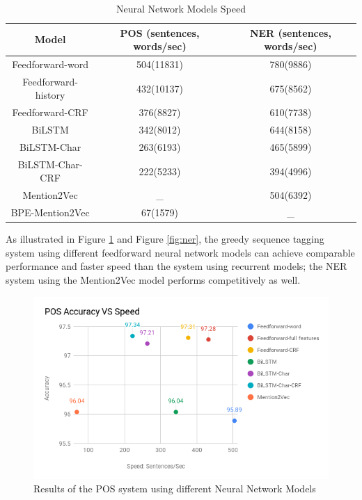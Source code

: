 \documentclass{sfuthesis}
\begin{document}
\begin{table}[]
\centering
\caption{Neural Network Models Speed}
\label{table:my-label2}
\begin{tabular}{|c|c|c|}
\hline
Model       & POS  (sentences, words/sec)  & NER  (sentences, words/sec)      \\ \hline
Feedforward-word    & 504(11831)     & 780(9886)    \\ \hline
Feedforward-history & 432(10137)     & 675(8562)     \\ \hline
Feedforward-CRF     & 376(8827)     & 610(7738)     \\ \hline
BiLSTM             & 342(8012)     & 644(8158)       \\ \hline
BiLSTM-Char        & 263(6193)  & 465(5899)             \\ \hline
BiLSTM-Char-CRF    & 222(5233)  & 394(4996)         \\ \hline
Mention2Vec         & _      & 504(6392)              \\ \hline
BPE-Mention2Vec     & 67(1579)  &  _               \\ \hline   
\end{tabular}
\end{table}

As illustrated in Figure \ref{fig:pos} and Figure \ref{fig:ner}, the greedy sequence tagging system using different feedforward neural network models can achieve comparable performance and faster speed than the system using recurrent models; the NER system using the Mention2Vec model performs competitively as well.

\begin{figure}
  \centering
  \includegraphics[scale=0.7]{pos.png}
 \caption{Results of the POS system using different Neural Network Models}
  \label{fig:pos}
\end{figure}
\end{document}
